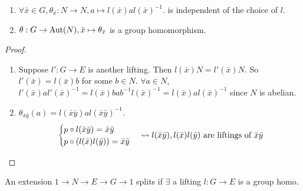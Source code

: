 \begin{prop} \mbox{}
  \begin{enumerate}
    \item $\forall \bar{x}\in G, \theta_{\bar{x}}: N \to N, a \mapsto l(\bar{x})al(\bar{x})^{-1}$.
      is independent of the choice of $l$.
    \item $\theta: G \to \operatorname{Aut}(N), \bar{x} \mapsto \theta_{\bar{x}}$ is a group homomorphism.
  \end{enumerate}
  \begin{proof} \mbox{}
    \begin{enumerate}
      \item Suppose $l': G \to E$ is another lifting. Then $l(\bar{x})N = l'(\bar{x})N$.
        So $l'(\bar{x}) = l(\bar{x})b$ for some $b \in N$.
        $\forall a \in N$, $l'(\bar{x})al'(\bar{x})^{-1} = l(\bar{x})bab^{-1}l(\bar{x})^{-1}
        = l(\bar{x})al(\bar{x})^{-1}$ since $N$ is abelian.
      \item $\theta_{\bar{x}\bar{y}}(a) = l(\bar{x}\bar{y})al(\bar{x}\bar{y})^{-1}$.
        \[
          \begin{cases}
            p \circ l(\bar{x}\bar{y}) = \bar{x}\bar{y} \\
            p \circ (l(\bar{x})l(\bar{y})) = \bar{x}\bar{y}
          \end{cases}
          \leadsto l(\bar{x}\bar{y}), l(\bar{x})l(\bar{y})
          \text{~are liftings of~} \bar{x}\bar{y}
          \qedhere
        \]
    \end{enumerate}
  \end{proof}
\end{prop}

\begin{definition}
  An extension $1\to N\to E\to G\to 1$ splits if $\exists$ a lifting
  $l: G\to E$ is a group homo.
\end{definition}

